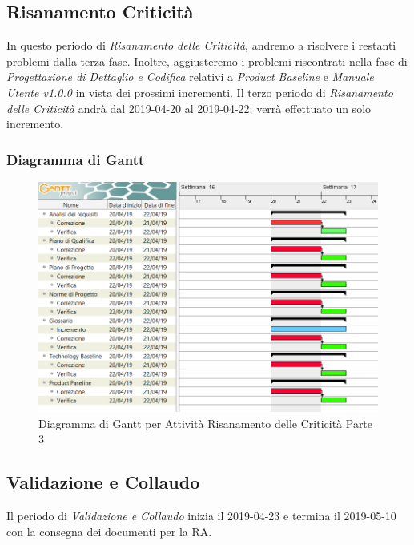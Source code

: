 \subsection{Risanamento Criticità}
\label{RC3}
In questo periodo di \textit{Risanamento delle Criticità}, andremo a risolvere i restanti problemi dalla terza fase. Inoltre, aggiusteremo i problemi riscontrati nella fase di \textit{Progettazione di Dettaglio e Codifica} relativi a \textit{Product Baseline} e \textit{Manuale Utente v1.0.0} in vista dei prossimi incrementi.
Il terzo periodo di \textit{Risanamento delle Criticità} andrà dal 2019-04-20 al 2019-04-22; verrà effettuato un solo incremento.

\subsubsection{Diagramma di Gantt}
\begin{figure}[h]
	\centering
  		\includegraphics[width=1.0\linewidth]{./images/RisanamentoCriticita3.png}
  		\caption{Diagramma di Gantt per Attività Risanamento delle Criticità Parte 3}
  		\label{fig:Gantt Risananmento Criticità 3}
\end{figure}

\newpage
\subsection{Validazione e Collaudo}
\label{VEC}
Il periodo di \textit{Validazione e Collaudo} inizia il 2019-04-23 e termina il 2019-05-10 con la consegna dei documenti per la RA. 


